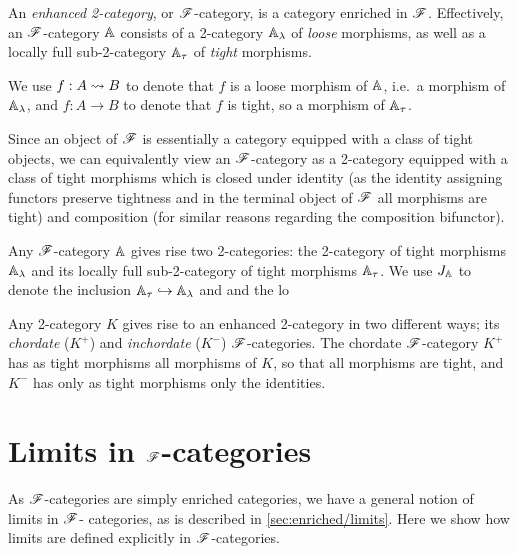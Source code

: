 \documentclass[../thesis.tex]{subfiles}
\begin{document}
  \begin{definition}
    An \emph{enhanced 2-category}, or ${\mathscr{F}}$-category, is a category enriched in ${\mathscr{F}}$.
    Effectively, an ${\mathscr{F}}$-category ${\mathbb{A}}$ consists of a 2-category ${\mathbb{A}}_\lambda$ of
    \emph{loose} morphisms, as well as a locally full sub-2-category ${\mathbb{A}}_\tau$ of
    \emph{tight} morphisms.
  \end{definition}
  \begin{notation}
    We use $f : A \rightsquigarrow B$ to denote that $f$ is a loose morphism of ${\mathbb{A}}$, i.e.\ a morphism of
    ${\mathbb{A}}_\lambda$, and $f : A \to B$ to denote that $f$ is tight, so a morphism of ${\mathbb{A}}_\tau$.
  \end{notation}
  \begin{remark}
    Since an object of ${\mathscr{F}}$ is essentially a category equipped with a class of tight objects, we
    can equivalently view an ${\mathscr{F}}$-category as a 2-category equipped with a class of tight morphisms
    which is closed under identity (as the identity assigning functors preserve tightness and in the
    terminal object of ${\mathscr{F}}$ all morphisms are tight) and composition (for similar reasons regarding
    the composition bifunctor).
  \end{remark}

  Any ${\mathscr{F}}$-category ${\mathbb{A}}$ gives rise two 2-categories: the 2-category of tight morphisms ${\mathbb{A}}_
  \lambda$ and its locally full sub-2-category of tight morphisms ${\mathbb{A}}_\tau$. We use $J_{\mathbb{A}}$ to
  denote the inclusion ${\mathbb{A}}_\tau \hookrightarrow {\mathbb{A}}_\lambda$ and and the
  lo

  Any 2-category $K$ gives rise to an enhanced 2-category in two different ways; its \emph{chordate}
  ($K^+$) and \emph{inchordate} ($K^-$) ${\mathscr{F}}$-categories. The chordate ${\mathscr{F}}$-category $K^+$ has as
  tight morphisms all morphisms of $K$, so that all morphisms are tight, and $K^-$ has only as tight
  morphisms only the identities.

  \section{Limits in \texorpdfstring{${\mathscr{F}}$}{F}-categories}
  As ${\mathscr{F}}$-categories are simply enriched categories, we have a general notion of limits in ${\mathscr{F}}$-%
  categories, as is described in \cref{sec:enriched/limits}. Here we show how limits are defined
  explicitly in ${\mathscr{F}}$-categories.
\end{document}
